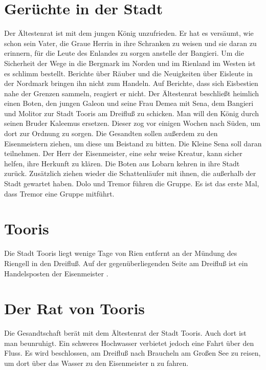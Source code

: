 \documentclass[12pt,a4paper,onecolumn,twoside,ngerman]{book}
\newcommand{\Molitor}{Molitor}
\newcommand{\Sena}{Sena}
\newcommand{\Bangiri}{Bangieri}
\newcommand{\Enland}{Enland}
\newcommand{\Schattenlaufer}{Schattenläufer}
\newcommand{\Dolo}{Dolo}
\newcommand{\Tremor}{Tremor}
\newcommand{\Lobarn}{Lobarn}
\newcommand{\Nordmark}{Nordmark}
\newcommand{\Bergmark}{Bergmark}
\newcommand{\Eisleute}{Eisleute}
\newcommand{\Eisbestien}{Eisbestien}
\newcommand{\Rhinland}{Rienland}
\newcommand{\Rhingell}{Riengell}
\newcommand{\Rhin}{Rien}
\newcommand{\Kalemus}{Kaleemus}
\newcommand{\Galeon}{Galeon}
\newcommand{\Demea}{Demea}
\newcommand{\Dreifluss}{Dreifluß}
\newcommand{\Toris}{Tooris}
\newcommand{\Braucheln}{Braucheln}
\newcommand{\Eisenmeister}{Eisenmeister}
\begin{document}
{\section{Gerüchte in der Stadt}
Der Ältestenrat ist mit dem jungen König unzufrieden. Er hat es versäumt, wie schon sein Vater, die Graue Herrin in ihre Schranken zu weisen und sie daran zu erinnern, für die Leute des {\Enland}es zu sorgen anstelle der {\Bangiri}. Um die Sicherheit der Wege in die {\Bergmark} im Norden und im {\Rhinland} im Westen ist es schlimm bestellt. Berichte über Räuber und die Neuigkeiten über {\Eisleute} in der {\Nordmark} bringen ihn nicht zum Handeln. Auf Berichte, dass sich {\Eisbestien} nahe der Grenzen sammeln, reagiert er nicht.\linebreak
Der Ältestenrat beschließt heimlich einen Boten, den jungen {\Galeon} und seine Frau {\Demea} mit {\Sena}, dem {\Bangiri} und {\Molitor} zur Stadt {\Toris} am {\Dreifluss} zu schicken. Man will den König durch seinen Bruder {\Kalemus} ersetzen. Dieser zog vor einigen Wochen nach Süden, um dort zur Ordnung zu sorgen. Die Gesandten sollen außerdem zu den {\Eisenmeister}{n} ziehen, um diese um Beistand zu bitten. Die Kleine {\Sena} soll daran teilnehmen. Der Herr der {\Eisenmeister}, eine sehr weise Kreatur, kann sicher helfen, ihre Herkunft zu klären.\linebreak
Die Boten aus {\Lobarn} kehren in ihre Stadt zurück. Zusätzlich ziehen wieder die {\Schattenlaufer} mit ihnen, die außerhalb der Stadt gewartet haben. {\Dolo} und {\Tremor} führen die Gruppe. Es ist das erste Mal, dass {\Tremor} eine Gruppe mitführt.

\section{\Toris}
Die Stadt {\Toris} liegt wenige Tage von {\Rhin} entfernt an der Mündung des {\Rhingell} in den {\Dreifluss}. Auf der gegenüberliegenden Seite am {\Dreifluss} ist ein Handelsposten der {\Eisenmeister} .

\section{Der Rat von \Toris}
Die Gesandtschaft berät mit dem Ältestenrat der Stadt {\Toris}. Auch dort ist man beunruhigt. Ein schweres Hochwasser verbietet jedoch eine Fahrt über den Fluss. Es wird beschlossen, am {\Dreifluss} nach {\Braucheln} am Großen See zu reisen, um dort über das Wasser zu den {\Eisenmeister} n zu fahren.

}
\end{document}

